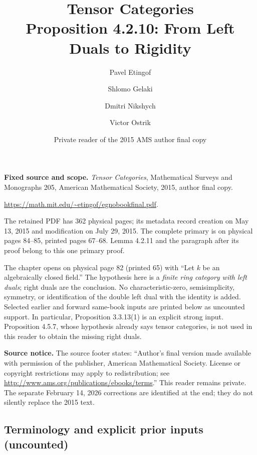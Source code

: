 \documentclass[11pt]{article}
\title{Tensor Categories\\Proposition 4.2.10: From Left Duals to Rigidity}
\author{Pavel Etingof \and Shlomo Gelaki \and Dmitri Nikshych \and Victor Ostrik}
\date{Private reader of the 2015 AMS author final copy}
\begin{document}
\maketitle

\noindent\textbf{Fixed source and scope.}
\emph{Tensor Categories}, Mathematical Surveys and Monographs 205,
American Mathematical Society, 2015, author final copy.
\par\noindent\url{https://math.mit.edu/~etingof/egnobookfinal.pdf}.
\par\noindent
The retained PDF has 362 physical pages; its metadata record creation on
May 13, 2015 and modification on July 29, 2015. The complete primary is
on physical pages 84--85, printed pages 67--68. Lemma 4.2.11 and the
paragraph after its proof belong to this one primary proof.

The chapter opens on physical page 82 (printed 65) with ``Let $k$ be an
algebraically closed field.'' The hypothesis here is a \emph{finite ring
category with left duals}; right duals are the conclusion. No
characteristic-zero, semisimplicity, symmetry, or identification of the
double left dual with the identity is added. Selected earlier and forward
same-book inputs are printed below as uncounted support. In particular,
Proposition 3.3.13(1) is an explicit strong input. Proposition 4.5.7,
whose hypothesis already says tensor categories, is not used in this
reader to obtain the missing right duals.

\noindent\textbf{Source notice.}
The source footer states: ``Author's final version made available with
permission of the publisher, American Mathematical Society. License or
copyright restrictions may apply to redistribution; see
\url{http://www.ams.org/publications/ebooks/terms}.'' This reader remains
private. The separate February 14, 2026 corrections are identified at the
end; they do not silently replace the 2015 text.

\subsection*{Terminology and explicit prior inputs (uncounted)}
\end{document}
